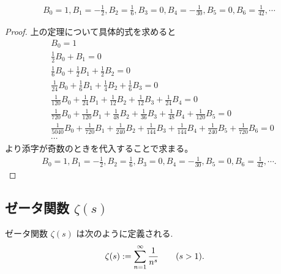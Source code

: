 \documentclass[uplatex,diffipdfmx,a4paper,11pt]{jlreq}
\begin{document}
\begin{proposition}
  \begin{align}
    B_0 = 1, B_1 = -\frac{1}{2}, B_2 = \frac{1}{6}, B_3 = 0, B_4 = -\frac{1}{30}, B_5 = 0, B_6 = \frac{1}{42}, \cdots
  \end{align}
\end{proposition}
\begin{proof}
  上の定理について具体的式を求めると
  \begin{align}
     & B_0 = 1                                                                                                                                 \\
     & \frac{1}{2}B_0 + B_1 = 0                                                                                                                \\
     & \frac{1}{6}B_0 + \frac{1}{2}B_1 + \frac{1}{2}B_2 = 0                                                                                    \\
     & \frac{1}{24}B_0 + \frac{1}{6}B_1 + \frac{1}{4}B_2 + \frac{1}{6}B_3 = 0                                                                  \\
     & \frac{1}{120}B_0 + \frac{1}{24}B_1 + \frac{1}{12}B_2 + \frac{1}{12}B_3 + \frac{1}{24}B_4 = 0                                            \\
     & \frac{1}{720}B_0 + \frac{1}{120}B_1 + \frac{1}{48}B_2 + \frac{1}{36}B_3 + \frac{1}{48}B_4 + \frac{1}{120}B_5 = 0                        \\
     & \frac{1}{5040}B_0 + \frac{1}{720}B_1 + \frac{1}{240}B_2 + \frac{1}{144}B_3 + \frac{1}{144}B_4 + \frac{1}{240}B_5 + \frac{1}{720}B_6 = 0 \\
     & \cdots
  \end{align}
  より添字が奇数のときを代入することで求まる。
  \begin{align}
    B_0 = 1, B_1 = -\frac{1}{2}, B_2 = \frac{1}{6}, B_3 = 0, B_4 = -\frac{1}{30}, B_5 = 0, B_6 = \frac{1}{42}, \cdots.
  \end{align}
\end{proof}



\subsection{ゼータ関数 $\zeta(s)$}
\begin{definition}[ゼータ関数]
  ゼータ関数 $\zeta(s)$ は次のように定義される.
  \begin{align}
    \zeta(s) & := \sum_{n=1}^{\infty}\frac{1}{n^s} \qquad (\real s > 1).
  \end{align}
\end{definition}
\end{document}
